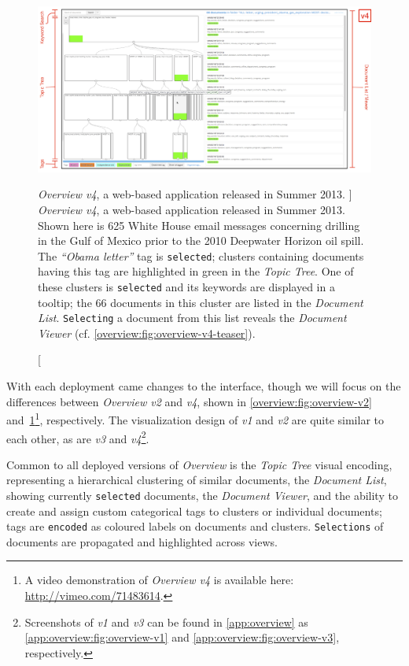 \begin{figure}
	\centering
	\includegraphics[width=\textwidth]{figures/overview-v4-annotated.png}
	\caption
	[
	    \textsl{Overview v4}, a web-based application released in Summer 2013.
	]
	{
    	\textsl{Overview v4}, a web-based application released in Summer 2013.
    	Shown here is 625 White House email messages concerning drilling in the Gulf of Mexico prior to the 2010 Deepwater Horizon oil spill.
    	The \textsl{``Obama letter''} tag is {\tt selected}; clusters containing documents having this tag are highlighted in green in the \textsl{Topic Tree}.
    	One of these clusters is {\tt selected} and its keywords are displayed in a tooltip; the 66 documents in this cluster are listed in the \textsl{Document List}. 
    	{\tt Selecting} a document from this list reveals the \textsl{Document Viewer} (cf. \autoref{overview:fig:overview-v4-teaser}).
	}
	\centering
	\label{overview:fig:overview-v4}
\end{figure}


With each deployment came changes to the interface, though we will focus on the differences between {\it Overview v2} and {\it v4}, shown in \autoref{overview:fig:overview-v2} and~\ref{overview:fig:overview-v4}\footnote{A video demonstration of {\it Overview v4} is available here: \url{http://vimeo.com/71483614}.}, respectively.
The visualization design of {\it v1} and {\it v2} are quite similar to each other, as are {\it v3} and {\it v4}\footnote{Screenshots of {\it v1} and {\it v3} can be found in \autoref{app:overview} as \autoref{app:overview:fig:overview-v1} and \autoref{app:overview:fig:overview-v3}, respectively.}.  

Common to all deployed versions of {\it Overview} is the {\it Topic Tree} visual encoding, representing a hierarchical clustering of similar documents, the {\it Document List}, showing currently {\tt selected} documents, the {\it Document Viewer}, and the ability to create and assign custom categorical tags to clusters or individual documents; tags are {\tt encoded} as coloured labels on documents and clusters.
{\tt Selections} of documents are propagated and highlighted across views.

